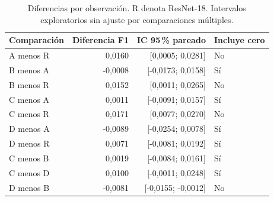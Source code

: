 \begin{table}[H]
\centering
\small
\caption{Diferencias por observación. R denota ResNet-18. Intervalos exploratorios sin ajuste por comparaciones múltiples.}
\label{tab:paired}
\begin{tabularx}{\linewidth}{Y r r l}
\toprule
\textbf{Comparación} & \textbf{Diferencia F1} & \textbf{IC 95\,\% pareado} & \textbf{Incluye cero}\\
\midrule
A menos R & 0,0160 & [0,0005; 0,0281] & No\\
B menos A & -0,0008 & [-0,0173; 0,0158] & Sí\\
B menos R & 0,0152 & [0,0011; 0,0265] & No\\
C menos A & 0,0011 & [-0,0091; 0,0157] & Sí\\
C menos R & 0,0171 & [0,0077; 0,0270] & No\\
D menos A & -0,0089 & [-0,0254; 0,0078] & Sí\\
D menos R & 0,0071 & [-0,0081; 0,0192] & Sí\\
C menos B & 0,0019 & [-0,0084; 0,0161] & Sí\\
C menos D & 0,0100 & [-0,0011; 0,0248] & Sí\\
D menos B & -0,0081 & [-0,0155; -0,0012] & No\\
\bottomrule
\end{tabularx}
\end{table}
